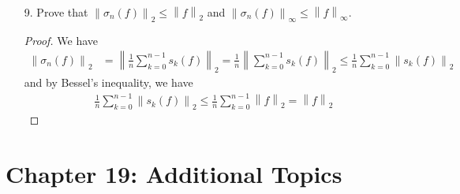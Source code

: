 \documentclass{article}
\begin{document}
\begin{itemize}
	\item[9.] Prove that $\left\lVert \sigma_n(f) \right\rVert_2\le \left\lVert f \right\rVert_2$ and $\left\lVert \sigma_n(f) \right\rVert_\infty \le \left\lVert f \right\rVert_\infty.$
		\begin{proof}
			We have
			\begin{align*}
				\left\lVert \sigma_n(f) \right\rVert_2 &= \left\lVert \frac{1}{n} \sum_{k=0}^{n-1} s_k(f) \right\rVert_2 = \frac{1}{n} \left\lVert \sum_{k=0}^{n-1} s_k(f) \right\rVert_2 \le \frac{1}{n} \sum_{k=0}^{n-1} \left\lVert s_k(f) \right\rVert_2
			\end{align*}
			and by Bessel's inequality, we have
			\begin{align*}
				\frac{1}{n} \sum_{k=0}^{n-1} \left\lVert s_k(f) \right\rVert_2\le \frac{1}{n} \sum_{k=0}^{n-1} \left\lVert f \right\rVert_2 = \left\lVert f \right\rVert_2
			\end{align*}
		\end{proof}
		
\end{itemize}

\section*{Chapter 19: Additional Topics}
\end{document}
